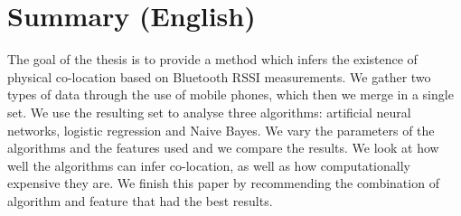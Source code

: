 \chapter{Summary (English)}

The goal of the thesis is to provide a method which infers the existence of physical co-location based on Bluetooth RSSI measurements. We gather two types of data through the use of mobile phones, which then we merge in a single set. We use the resulting set to analyse three algorithms: artificial neural networks, logistic regression and Naive Bayes. We vary the parameters of the algorithms and the features used and we compare the results. We look at how well the algorithms can infer co-location, as well as how computationally expensive they are. We finish this paper by recommending the combination of algorithm and feature that had the best results.    